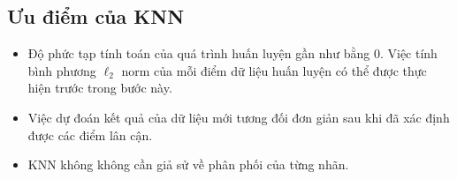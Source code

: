 





\subsection{Ưu điểm của KNN}
\begin{itemize}
\item Độ phức tạp tính toán của quá trình huấn luyện gần như bằng 0. Việc tính bình phương $\ell_2$ norm của mỗi điểm dữ liệu huấn luyện có thể được thực hiện trước trong bước này.

\item Việc dự đoán kết quả của dữ liệu mới tương đối đơn giản sau khi đã xác
định được các điểm lân cận.

\item KNN không không cần giả sử về phân phối của từng nhãn.
\end{itemize}



